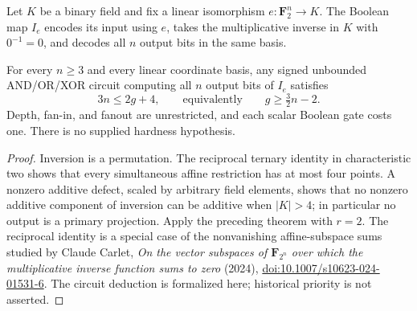 \begin{definition}
  \label{def:lowerbounds-algebraic-geometry-inversion}
  \leanok
  Let $K$ be a binary field and fix a linear isomorphism
  $e:\mathbf F_2^n\longrightarrow K$. The Boolean map $I_e$ encodes its input
  using $e$, takes the multiplicative inverse in $K$ with $0^{-1}=0$, and
  decodes all $n$ output bits in the same basis.
\end{definition}

\begin{theorem}
  \label{thm:lowerbounds-algebraic-geometry-inversion}
  \leanok
  For every $n\ge3$ and every linear coordinate basis, any signed unbounded
  AND/OR/XOR circuit computing all $n$ output bits of $I_e$ satisfies
  \[
    3n\le2g+4,
    \qquad\text{equivalently}\qquad g\ge\tfrac32n-2.
  \]
  Depth, fan-in, and fanout are unrestricted, and each scalar Boolean gate
  costs one. There is no supplied hardness hypothesis.
\end{theorem}
\begin{proof}
  \leanok
  Inversion is a permutation. The reciprocal ternary identity in characteristic
  two shows that every simultaneous affine restriction has at most four points.
  A nonzero additive defect, scaled by arbitrary field elements, shows that
  no nonzero additive component of inversion can be additive when $|K|>4$;
  in particular no output is a primary projection. Apply the preceding
  theorem with $r=2$. The reciprocal identity is a special case of the
  nonvanishing affine-subspace sums studied by Claude Carlet,
  \emph{On the vector subspaces of $\mathbf F_{2^n}$ over which the
  multiplicative inverse function sums to zero} (2024),
  \href{https://doi.org/10.1007/s10623-024-01531-6}{doi:10.1007/s10623-024-01531-6}.
  The circuit deduction is formalized here; historical priority is not asserted.
\end{proof}

